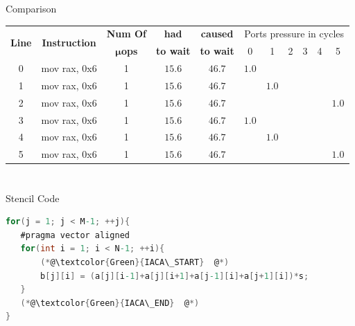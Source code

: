 \documentclass[10pt, tikz,border=2mm, xcolor=dvipsnames]{beamer}
\begin{document}
\begin{frame}[fragile]{Comparison}
\begin{mdframed}[backgroundcolor=light-gray, roundcorner=10pt,leftmargin=1, rightmargin=1, innerleftmargin=15, innertopmargin=5,innerbottommargin=5, outerlinewidth=1, linecolor=light-gray]
\begin{minipage}{0.9\textwidth}
    \begin{adjustbox}{height=0.17\textheight,width=0.9\textwidth} \begin{tabular}
            {|c|r|c|c|c|c|c|c|c|c|c|}
            \hline
            \multicolumn{1}{|c|}{\multirow{2}{*}{\textbf{Line}}}&\multicolumn{1}{|c|}{\multirow{2}{*}{\textbf{Instruction}}}&\textbf{Num Of}& \textbf{had} & \textbf{caused} & \multicolumn{6}{|c|}{Ports pressure in cycles}\\
            \cline{6-11}
            &&$\boldsymbol{\mu}$\textbf{ops} & \textbf{to wait} & \textbf{to wait} & 0  & 1 & 2 & 3 & 4 & 5 \\ \cline{1-11}
            0&mov rax, 0x6 & 1 & $15.6$ & $46.7$ & $1.0$ &       &       &       &       &       \\
            1&mov rax, 0x6 & 1 & $15.6$ & $46.7$ &       & $1.0$ &       &       &       &       \\
            2&mov rax, 0x6 & 1 & $15.6$ & $46.7$ &       &       &       &       &       & $1.0$ \\
            3&mov rax, 0x6 & 1 & $15.6$ & $46.7$ & $1.0$ &       &       &       &       &       \\
            4&mov rax, 0x6 & 1 & $15.6$ & $46.7$ &       & $1.0$ &       &       &       &       \\
            5&mov rax, 0x6 & 1 & $15.6$ & $46.7$ &       &       &       &       &       & $1.0$ \\
            \hline
    \end{tabular}\end{adjustbox}
\end{minipage}
\end{mdframed}
\end{frame}



\section{\osaca}

\begin{frame}[fragile]{Stencil Code}
\begin{mdframed}[backgroundcolor=light-gray, roundcorner=10pt,leftmargin=1, rightmargin=1, innerleftmargin=15, innertopmargin=1,innerbottommargin=1, outerlinewidth=1, linecolor=light-gray]
\begin{lstlisting}[language=C, basicstyle=\scriptsize]
for(j = 1; j < M-1; ++j){
   #pragma vector aligned
   for(int i = 1; i < N-1; ++i){
       (*@\textcolor{Green}{IACA\_START}  @*)
       b[j][i] = (a[j][i-1]+a[j][i+1]+a[j-1][i]+a[j+1][i])*s;
   }
   (*@\textcolor{Green}{IACA\_END}  @*)
}
\end{lstlisting}
\end{mdframed}
\end{frame}
\end{document}
